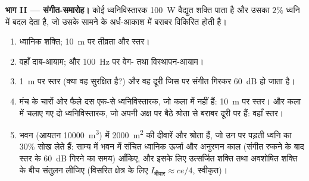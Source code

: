 \begin{problem}
\medskip
\noindent\textbf{भाग II --- संगीत-समारोह।}
कोई ध्वनिविस्तारक \qty{100}{W} वैद्युत शक्ति पाता है और उसका
$2\%$ ध्वनि में बदल देता है, जो उसके सामने के अर्ध-आकाश में बराबर
विकिरित होती है।
\begin{enumerate}[resume]
  \item ध्वानिक शक्ति; \qty{10}{m} पर तीव्रता और स्तर।
  \item वहाँ दाब-आयाम; और \qty{100}{Hz} पर वेग- तथा विस्थापन-आयाम।
  \item \qty{1}{m} पर स्तर (क्या वह सुरक्षित है?) और वह दूरी जिस पर संगीत
        गिरकर \qty{60}{dB} हो जाता है।
  \item मंच के चारों ओर फैले दस एक-से ध्वनिविस्तारक, जो कला में नहीं
        हैं: \qty{10}{m} पर स्तर। और कला में चलाए गए दो ध्वनिविस्तारक, जो
        अपनी अक्ष पर बैठे श्रोता से बराबर दूरी पर हैं: वहाँ स्तर।
  \item भवन (आयतन \qty{10000}{m^3}) में \qty{2000}{m^2} की दीवारें और श्रोता हैं, जो उन पर पड़ती ध्वनि का $30\%$ सोख
        लेते हैं: साम्य में भवन में संचित ध्वानिक ऊर्जा और
        अनुरणन काल (संगीत रुकने के बाद स्तर के \qty{60}{dB} गिरने का
        समय) आँकिए, और इसके लिए उत्सर्जित शक्ति तथा अवशोषित शक्ति के
        बीच संतुलन लीजिए (विसरित क्षेत्र के लिए $I_{\text{दीवार}} \approx ce/4$, स्वीकृत)।
\end{enumerate}


\end{problem}
